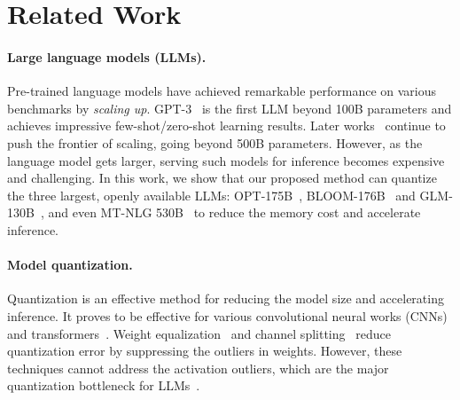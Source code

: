 \section{Related Work}
\paragraph{Large language models (LLMs).} Pre-trained language models have achieved remarkable performance on various benchmarks by \emph{scaling up}. GPT-3~\cite{brown2020language} is the first LLM beyond 100B parameters and achieves impressive few-shot/zero-shot learning results. Later works~\cite{rae2021scaling,smith2022using,du2022glam,chowdhery2022palm}  continue to push the frontier of scaling, going beyond 500B parameters. However, as the language model gets larger, serving such models for inference becomes expensive and challenging. In this work, we show that our proposed method can quantize the three largest, openly available LLMs: OPT-175B~\cite{opt}, BLOOM-176B~\cite{scao2022bloom} and GLM-130B~\cite{zeng2022glm}, and even MT-NLG 530B~\cite{smith2022using} to reduce the memory cost and accelerate inference.

\paragraph{Model quantization.} Quantization is an effective method for reducing the model size and accelerating inference. It proves to be effective for various convolutional neural works (CNNs)~\cite{han2016deep,  jacob2018quantization, nagel2019data, wang2019haq, lin2020mcunet} and transformers~\cite{shen2020q, kim2021bert, liu2021post,spatten,bondarenko2021understanding}. Weight equalization~\cite{nagel2019data} and channel splitting~\cite{zhao2019improving} reduce quantization error by suppressing the outliers in weights. However, these techniques cannot address the activation outliers, which are the major quantization bottleneck for LLMs~\cite{dettmers2022llmint8}.

